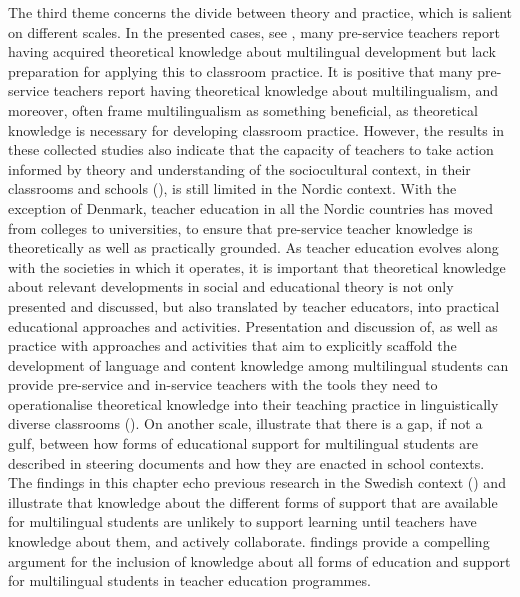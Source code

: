 \documentclass[output=paper]{langscibook}
\begin{document}
The third theme concerns the divide between theory and practice, which is salient on different scales. In the presented cases, see \citet{chapters/8_heikkola, chapters/6_iversen, chapters/2_Gunnthorsdottira, chapters/3_rosen}, many pre-service teachers report having acquired theoretical knowledge about multilingual development but lack preparation for applying this to classroom practice. It is positive that many pre-service teachers report having theoretical knowledge about multilingualism, and moreover, often frame multilingualism as something beneficial, as theoretical knowledge is necessary for developing classroom practice. However, the results in these collected studies also indicate that the capacity of teachers to take action informed by theory and understanding of the sociocultural context, in their classrooms and schools (\citealt{Leung2022}), is still limited in the Nordic context. With the exception of Denmark, teacher education in all the Nordic countries has moved from colleges to universities, to ensure that pre-service teacher knowledge is theoretically as well as practically grounded. As teacher education evolves along with the societies in which it operates, it is important that theoretical knowledge about relevant developments in social and educational theory is not only presented and discussed, but also translated by teacher educators, into practical educational approaches and activities. Presentation and discussion of, as well as practice with approaches and activities that aim to explicitly scaffold the development of language and content knowledge among multilingual students can provide pre-service and in-service teachers with the tools they need to operationalise theoretical knowledge into their teaching practice in linguistically diverse classrooms (\citealt{Gibbons2014,Iversen2020}). On another scale, \citet{chapters/3_rosen} illustrate that there is a gap, if not a gulf, between how forms of educational support for multilingual students are described in steering documents and how they are enacted in school contexts. The findings in this chapter echo previous research in the Swedish context (\citealt{Warren2017}) and illustrate that knowledge about the different forms of support that are available for multilingual students are unlikely to support learning until teachers have knowledge about them, and actively collaborate.  findings provide a compelling argument for the inclusion of knowledge about all forms of education and support for multilingual students in teacher education programmes.
\end{document}
